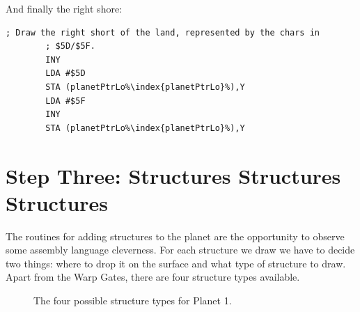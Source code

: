 And finally the right shore:

\begin{lstlisting}[caption=Drawing the right hand shore..,escapechar=\%]
        ; Draw the right short of the land, represented by the chars in
        ; $5D/$5F.
        INY
        LDA #$5D
        STA (planetPtrLo%\index{planetPtrLo}%),Y
        LDA #$5F
        INY
        STA (planetPtrLo%\index{planetPtrLo}%),Y
\end{lstlisting}


\section{Step Three: Structures Structures Structures}
The routines for adding structures to the planet are the opportunity to observe some assembly language cleverness.
For each structure we draw we have to decide two things: where to drop it on the surface and what type of structure
to draw. Apart from the Warp Gates, there are four structure types available. 

\begin{figure}[H]
  {
    \setlength{\tabcolsep}{3.0pt}
    \setlength\cmidrulewidth{\heavyrulewidth} %
    \begin{adjustbox}{width=15cm,center}
      \begin{subfigure}{0.3\textwidth}
        
      \end{subfigure}
      \begin{subfigure}{0.3\textwidth}
        
      \end{subfigure}
      \begin{subfigure}{0.3\textwidth}
        
      \end{subfigure}
      \begin{subfigure}{0.3\textwidth}
        
      \end{subfigure}
    \end{adjustbox}
  }\caption[]{The four possible structure types for Planet 1.}
\end{figure}

